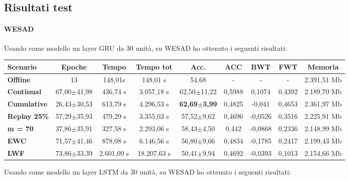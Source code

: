 \documentclass[11pt, a4paper, twoside, openright]{book}
\begin{document}
\subsection{Risultati test}
\paragraph{WESAD} Usando come modello un layer GRU da 30 unità, su WESAD ho ottenuto i seguenti risultati:

\begin{tabular}{l|c|c|c|c|c|c|c|c}
\textbf{Scenario} & \textbf{Epoche} & \textbf{Tempo} & \textbf{Tempo tot} & \textbf{Acc.} & \textbf{ACC} & \textbf{BWT} & \textbf{FWT} & \textbf{Memoria}\\
\hline
 \textbf{Offline} & 13 & 148,01s & 148,01 s & 54,68 & - & - & - & 2.391,51 Mb\\
\textbf{Continual} & 67,00$\pm$41,98 & 436,74 s & 3.057,18 s & 62,50$\pm$11,22 & 0,5988 & 0,1074 & 0,4392 & 2.189,70 Mb\\
\textbf{Cumulative} & 26,43$\pm$30,53 & 613,79 s & 4.296,53 s & \textbf{62,69$\pm$3,99} & 0,4825 & -0,041 & 0,4653 & 2.361,97 Mb\\
\textbf{Replay 25\%} & 57,29$\pm$35,93 & 479,29 s & 3.355,03 s & 57,52$\pm$9,62 & 0,4696 & -0,0526 & 0,3516 & 2.225,91 Mb\\
\textbf{m = 70} & 37,86$\pm$35,91 & 327,58 s & 2.293,06 s & 58,43$\pm$4,50 & 0,442 & -0,0868 & 0,2336 & 2.148,99 Mb\\
\textbf{EWC} & 71,57$\pm$41,46 & 878,08 s & 6.146,56 s & 56,80$\pm$9,66 & 0,4834 & -0,1785 & 0,2417 & 2.199,43 Mb\\
\textbf{LWF} & 73,86$\pm$33,39 & 2.601,09 s & 18.207,63 s & 50,41$\pm$9,94 & 0,4692 & -0,0393 & 0,1013 & 2.154,66 Mb\\
\end{tabular}
Usando come modello un layer LSTM da 30 unità, su WESAD ho ottenuto i seguenti risultati:
\end{document}

